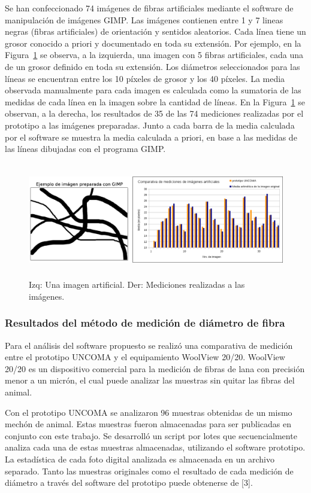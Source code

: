 \documentclass[runningheads,a4paper]{llncs}
\begin{document}
Se han confeccionado 74 imágenes de fibras artificiales mediante el software de manipulación de imágenes GIMP. Las imágenes contienen entre 1 y 7 lineas negras (fibras artificiales) de orientación  y sentidos aleatorios. Cada línea tiene un grosor conocido a priori y documentado en toda su extensión. Por ejemplo, en la Figura~\ref{fig:comparativa-artificial3} se observa, a la izquierda, una imagen con 5 fibras artificiales, cada una de un grosor definido en toda su extensión. Los diámetros seleccionados para las líneas se encuentran entre los 10 píxeles de grosor y los 40 píxeles. La media observada manualmente para cada imagen es calculada como la sumatoria de las medidas de cada línea en la imagen sobre la cantidad de líneas.
En la Figura~\ref{fig:comparativa-artificial3} se observan, a la derecha, los resultados de 35 de las 74 mediciones realizadas por el prototipo a las imágenes preparadas. Junto a cada barra de la media calculada por el software se muestra la media calculada a priori, en base a las medidas de las líneas dibujadas con el programa GIMP.
\begin{figure}
\centering
\includegraphics[height=5cm]{comparativa-artificial3}
\caption{Izq: Una imagen artificial. Der: Mediciones realizadas a las imágenes.}
\label{fig:comparativa-artificial3}
\end{figure}


\subsubsection{Resultados del método de medición de diámetro de fibra} 

Para el análisis del software propuesto se realizó una comparativa de medición entre el prototipo UNCOMA y el equipamiento WoolView 20/20. 
WoolView 20/20 es un dispositivo comercial para la medición de fibras de lana con precisión menor a un micrón, el cual puede analizar las muestras sin quitar las fibras del animal. 

Con el prototipo UNCOMA se analizaron 96 muestras obtenidas de un mismo mechón de animal. Estas muestras fueron almacenadas para ser publicadas en conjunto con este trabajo. Se desarrolló un script por lotes que secuencialmente analiza cada una de estas muestras almacenadas, utilizando el software prototipo. La estadística de cada foto digital analizada es almacenada en un archivo separado. Tanto las muestras originales como el resultado de cada medición de diámetro a través del software del prototipo puede obtenerse de [3].
\end{document}
